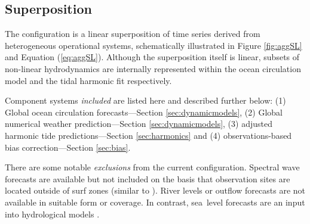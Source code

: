\subsection{Superposition}
\label{sec:concept}
The configuration is a linear superposition of time series derived from heterogeneous operational systems, schematically illustrated in Figure \ref{fig:aggSL} and Equation (\ref{eq:aggSL}).  
Although the superposition itself is linear, subsets of non-linear hydrodynamics are internally represented within the ocean circulation model  and the tidal harmonic fit respectively.

Component systems \textit{included} are listed here and described further below:
(1) Global ocean circulation forecasts---Section \ref{sec:dynamicmodels}, 
(2) Global numerical weather prediction---Section \ref{sec:dynamicmodels}, 
(3) adjusted harmonic tide predictions---Section \ref{sec:harmonics} and 
(4) observations-based bias correction---Section \ref{sec:bias}.

There are some notable \textit{exclusions} from the current configuration.
Spectral wave forecasts are available but not included on the basis that observation sites are located outside of surf zones (similar to  \cite{Tilburg:2004cg}).
River levels or outflow forecasts are not available in suitable form or coverage. In contrast, sea~level forecasts are an input into hydrological models \cite{Taylor:2011ud}.  

